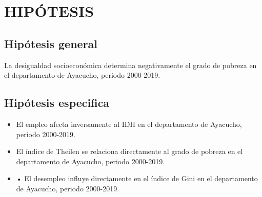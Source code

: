 \section{\large HIPÓTESIS}

\subsection{Hipótesis general}

La desigualdad socioeconómica determina negativamente el grado de pobreza en el departamento de Ayacucho, periodo 2000-2019.

\subsection{Hipótesis especifica}

\begin{itemize}
\item El empleo afecta inversamente al IDH en el departamento de Ayacucho, periodo 2000-2019.

\item El índice de Theilen se relaciona directamente al grado de pobreza en el departamento de Ayacucho, periodo 2000-2019.

\item •	El desempleo influye directamente en el índice de Gini en el departamento de Ayacucho, periodo 2000-2019.

\end{itemize}






		
